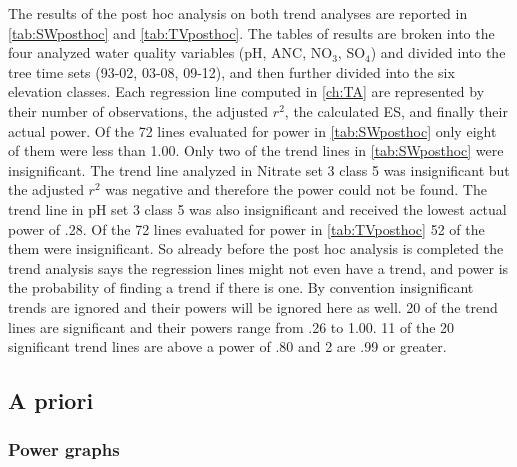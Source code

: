The results of the post hoc analysis on both trend analyses are reported in  \autoref{tab:SWposthoc} and \autoref{tab:TVposthoc}.
The tables of results are broken into the four analyzed water quality variables (pH, ANC, NO$_3$, SO$_4$) and divided into the tree time sets (93-02, 03-08, 09-12), and then further divided into the six elevation classes.
Each regression line computed in \autoref{ch:TA} are represented by their number of observations, the adjusted $r^2$, the calculated ES, and finally their actual power.
Of the 72 lines evaluated for power in \autoref{tab:SWposthoc} only eight of them were less than 1.00.
Only two of the trend lines in \autoref{tab:SWposthoc} were insignificant.
The trend line analyzed in Nitrate set 3 class 5 was insignificant but the adjusted $r^2$ was negative and therefore the power could not be found.
The trend line in pH set 3 class 5 was also insignificant and received the lowest actual power of .28.
Of the 72 lines evaluated for power in \autoref{tab:TVposthoc} 52 of the them were insignificant.
So already before the post hoc analysis is completed the trend analysis says the regression lines might not even have a trend, and power is the probability of finding a trend if there is one.
By convention insignificant trends are ignored and their powers will be ignored here as well.
20 of the trend lines are significant and their powers range from .26 to 1.00.
11 of the 20 significant trend lines are above a power of .80 and 2 are .99 or greater.

\subsection{A priori}

\subsubsection{Power graphs}


